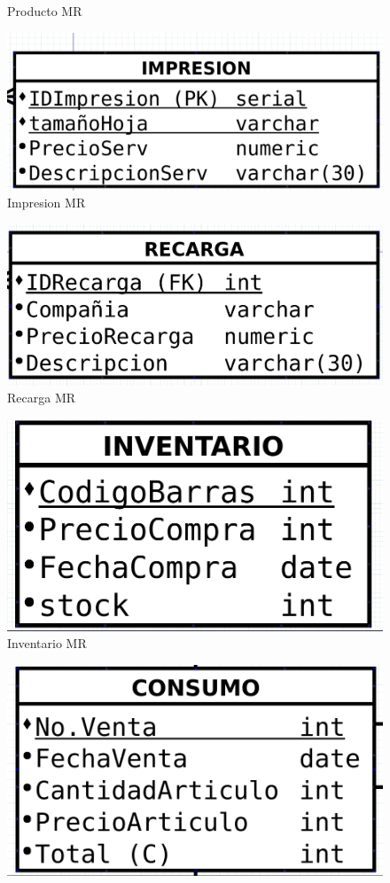 \documentclass[letter,12pt]{article}
\begin{document}
\begin{center}
\begin{figure}[H]
\caption{Producto MR}
\end{figure}
\begin{figure}[H]
\includegraphics[scale=.45]{impresionMR.png}
\caption{Impresion MR}
\end{figure}
\newpage
\begin{figure}[H]
\includegraphics[scale=.45]{recargaMR.png}
\caption{Recarga MR}
\end{figure}
\begin{figure}[H]
\includegraphics[scale=.45]{inventarioMR.png}
\caption{Inventario MR}
\end{figure}
\newpage
\begin{figure}[H]
\includegraphics[scale=.45]{ventaMR.png}

\end{figure}
\end{center}
\end{document}
